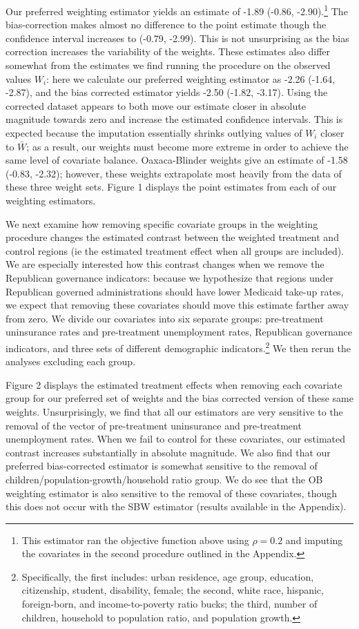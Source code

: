 \documentclass[12pt]{article}
\begin{document}
Our preferred weighting estimator yields an estimate of -1.89 (-0.86, -2.90).\footnote{This estimator ran the objective function above using $\rho = 0.2$ and imputing the covariates in the second procedure outlined in the Appendix.} The bias-correction makes almost no difference to the point estimate though the confidence interval increases to (-0.79, -2.99). This is not unsurprising as the bias correction increases the variability of the weights. These estimates also differ somewhat from the estimates we find running the procedure on the observed values $W_i$: here we calculate our preferred weighting estimator as -2.26 (-1.64, -2.87), and the bias corrected estimator yields -2.50 (-1.82, -3.17). Using the corrected dataset appears to both move our estimate closer in absolute magnitude towards zero and increase the estimated confidence intervals. This is expected because the imputation essentially shrinks outlying values of $W_i$ closer to $\bar{W}$; as a result, our weights must become more extreme in order to achieve the same level of covariate balance. Oaxaca-Blinder weights give an estimate of -1.58 (-0.83, -2.32); however, these weights extrapolate most heavily from the data of these three weight sets. Figure 1 displays the point estimates from each of our weighting estimators. 

We next examine how removing specific covariate groups in the weighting procedure changes the estimated contrast between the weighted treatment and control regions (ie the estimated treatment effect when all groups are included). We are especially interested how this contrast changes when we remove the Republican governance indicators: because we hypothesize that regions under Republican governed administrations should have lower Medicaid take-up rates, we expect that removing these covariates should move this estimate farther away from zero. We divide our covariates into six separate groups: pre-treatment uninsurance rates and pre-treatment unemployment rates, Republican governance indicators, and three sets of different demographic indicators.\footnote{Specifically, the first includes: urban residence, age group, education, citizenship, student, disability, female; the second, white race, hispanic, foreign-born, and income-to-poverty ratio bucks; the third, number of children, household to population ratio, and population growth.} We then rerun the analyses excluding each group. 

Figure 2 displays the estimated treatment effects when removing each covariate group for our preferred set of weights and the bias corrected version of these same weights. Unsurprisingly, we find that all our estimators are very sensitive to the removal of the vector of pre-treatment uninsurance and pre-treatment unemployment rates. When we fail to control for these covariates, our estimated contrast increases substantially in absolute magnitude. We also find that our preferred bias-corrected estimator is somewhat sensitive to the removal of children/population-growth/household ratio group. We do see that the OB weighting estimator is also sensitive to the removal of these covariates, though this does not occur with the SBW estimator (results available in the Appendix). 
\end{document}
